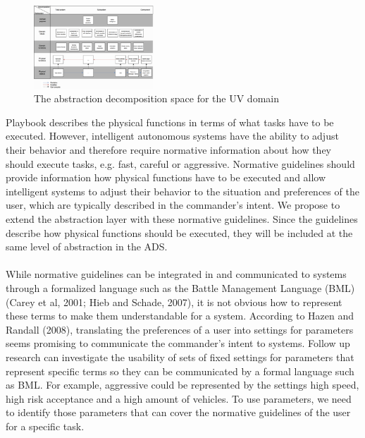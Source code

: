 \documentclass[twoside,twocolumn]{article}
\begin{document}
\\
\begin{figure}[h]
	\centering
		\includegraphics[width=0.4\textwidth]{images/ads.png}
	\caption{The abstraction decomposition space for the UV domain}
	\label{fig:ads}
\end{figure}
%
Playbook describes the physical functions in terms of what tasks have to be executed. However, intelligent autonomous systems have the ability to adjust their behavior and therefore require normative information about how they should execute tasks, e.g. fast, careful or aggressive. Normative guidelines should provide information how physical functions have to be executed and allow intelligent systems to adjust their behavior to the situation and preferences of the user, which are typically described in the commander's intent. We propose to extend the abstraction layer with these normative guidelines. Since the guidelines describe how physical functions should be executed, they will be included at the same level of abstraction in the ADS.
\\\\
While normative guidelines can be integrated in and communicated to systems through a formalized language such as the Battle Management Language (BML) (Carey et al, 2001; Hieb and Schade, 2007), it is not obvious how to represent these terms to make them understandable for a system. According to Hazen and Randall (2008), translating the preferences of a user into settings for parameters seems promising to communicate the commander's intent to systems. Follow up research can investigate the usability of sets of fixed settings for parameters that represent specific terms so they can be communicated by a formal language such as BML. For example, aggressive could be represented by the settings high speed, high risk acceptance and a high amount of vehicles. To use parameters, we need to identify those parameters that can cover the normative guidelines of the user for a specific task.
%
%
\end{document}
